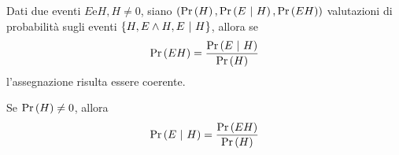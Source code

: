 \documentclass{subfiles}
\begin{document}
\begin{Theorem}
    Dati due eventi \(E \text{e} H, H \neq 0\), siano \((\Prob{H}, \Prob{E}[H], \Prob{EH})\) valutazioni di probabilità sugli eventi \(\Set{H, E \land H, E \Given H}\),
    allora se
    \[
        \Prob{EH} = \Frac{\Prob{E}[H]}{\Prob{H}}
    \]
    l'assegnazione risulta essere coerente.
\end{Theorem}
\begin{Corollary}
    Se \(\Prob{H} \neq 0\), allora
    \[
        \Prob{E}[H] = \Frac{\Prob{EH}}{\Prob{H}}
    \]
\end{Corollary}
\end{document}
